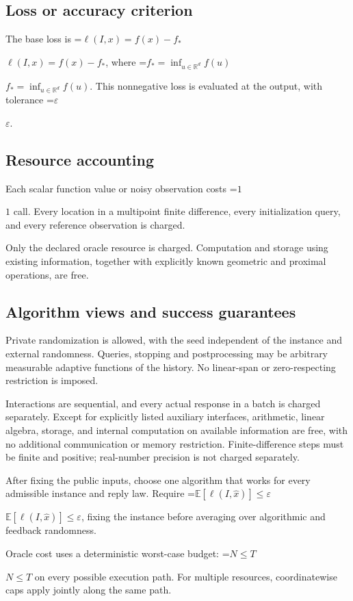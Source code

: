 \documentclass[10pt,a4paper]{article}
\newcommand{\AtlasMath}[1]{\par\begingroup\centering\setbox0=\hbox{$\displaystyle #1$}\ifdim\wd0>1.4\linewidth\typeout{ATLAS WIDE FORMULA: \the\wd0}\fi\ifdim\wd0>\linewidth\resizebox{\linewidth}{!}{\box0}\else\box0\fi\par\endgroup}
\newcommand{\AtlasInlineMath}[1]{\begingroup\setbox0=\hbox{$#1$}\ifdim\wd0>.4\linewidth\endgroup\AtlasMath{#1}\else\endgroup$#1$\fi}
\begin{document}
\subsection{Loss or accuracy criterion}
The base loss is \AtlasInlineMath{\ell(I,x)=f(x)-f_*}, where \AtlasInlineMath{f_*=\inf_{u\in \mathbb{R}^d}f(u)}. This nonnegative loss is evaluated at the output, with tolerance \AtlasInlineMath{\varepsilon}.

\subsection{Resource accounting}
Each scalar function value or noisy observation costs \AtlasInlineMath{1} call. Every location in a multipoint finite difference, every initialization query, and every reference observation is charged.

Only the declared oracle resource is charged. Computation and storage using existing information, together with explicitly known geometric and proximal operations, are free.

\subsection{Algorithm views and success guarantees}
Private randomization is allowed, with the seed independent of the instance and external randomness. Queries, stopping and postprocessing may be arbitrary measurable adaptive functions of the history. No linear-span or zero-respecting restriction is imposed.

Interactions are sequential, and every actual response in a batch is charged separately. Except for explicitly listed auxiliary interfaces, arithmetic, linear algebra, storage, and internal computation on available information are free, with no additional communication or memory restriction. Finite-difference steps must be finite and positive; real-number precision is not charged separately.

After fixing the public inputs, choose one algorithm that works for every admissible instance and reply law. Require \AtlasInlineMath{\mathbb{E}[\ell(I,\widehat{x})]\le \varepsilon}, fixing the instance before averaging over algorithmic and feedback randomness.

Oracle cost uses a deterministic worst-case budget: \AtlasInlineMath{N\le T} on every possible execution path. For multiple resources, coordinatewise caps apply jointly along the same path.
\end{document}
